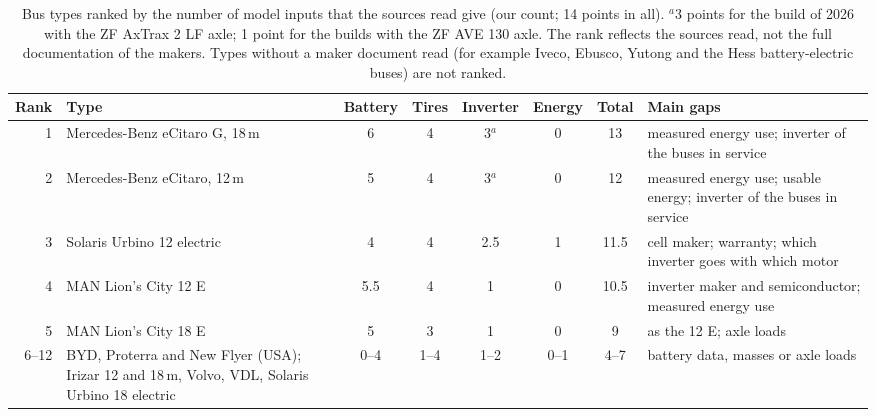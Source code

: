 \documentclass[11pt,a4paper]{article}
\theoremstyle{plain}
\theoremstyle{definition}
\theoremstyle{remark}
\begin{document}
\begin{table}[htbp]
\centering
\caption{Bus types ranked by the number of model inputs that the sources read give (our count; 14 points in all).
$^{a}$3 points for the build of 2026 with the ZF AxTrax 2 LF axle; 1 point for the builds with the ZF AVE 130 axle.
The rank reflects the sources read, not the full documentation of the makers.
Types without a maker document read (for example Iveco, Ebusco, Yutong and the Hess battery-electric buses) are not ranked.}
\label{tab:cs_ranking}
\small
\setlength{\tabcolsep}{4pt}
\begin{tabularx}{\linewidth}{@{}r>{\hsize=0.986\hsize\raggedright\arraybackslash}Xccccc>{\hsize=1.014\hsize\raggedright\arraybackslash}X@{}}
\toprule
\rowcolor{headgrey}
\textbf{Rank} & \textbf{Type} & \textbf{Battery} & \textbf{Tires} & \textbf{Inverter} & \textbf{Energy} & \textbf{Total} & \textbf{Main gaps} \tabularnewline
\midrule
1 & \raggedright Mercedes-Benz eCitaro G, 18\,m & 6 & 4 & 3$^{a}$ & 0 & 13 & \raggedright measured energy use; inverter of the buses in service \tabularnewline
2 & \raggedright Mercedes-Benz eCitaro, 12\,m & 5 & 4 & 3$^{a}$ & 0 & 12 & \raggedright measured energy use; usable energy; inverter of the buses in service \tabularnewline
3 & \raggedright Solaris Urbino 12 electric & 4 & 4 & 2.5 & 1 & 11.5 & \raggedright cell maker; warranty; which inverter goes with which motor \tabularnewline
4 & \raggedright MAN Lion's City 12 E & 5.5 & 4 & 1 & 0 & 10.5 & \raggedright inverter maker and semiconductor; measured energy use \tabularnewline
5 & \raggedright MAN Lion's City 18 E & 5 & 3 & 1 & 0 & 9 & \raggedright as the 12 E; axle loads \tabularnewline
6--12 & \raggedright BYD, Proterra and New Flyer (USA); Irizar 12 and 18\,m, Volvo, VDL, Solaris Urbino 18 electric & 0--4 & 1--4 & 1--2 & 0--1 & 4--7 & \raggedright battery data, masses or axle loads \tabularnewline
\bottomrule
\end{tabularx}
\end{table}
\end{document}
